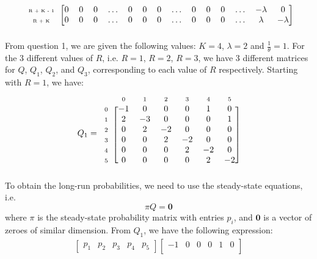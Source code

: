 \documentclass[12pt]{article}
\newcommand{\matindexx}[1]{\mbox{\tiny#1}}%
\newcommand{\matindex}[1]{\mbox{\scriptsize#1}}%
\begin{document}
\begin{equation*}
\begin{blockarray}{ccccccccccccccc}
\begin{block}{c[cccccccccccccc]}
            \matindexx{R + K - 1} & 0 & 0 & 0 & \dots & 0 & 0 & 0 & \dots & 0 & 0 & 0 & \dots & -\lambda & 0 \\
            \matindexx{R + K} & 0 & 0 & 0 & \dots & 0 & 0 & 0 & \dots & 0 & 0 & 0 & \dots & \lambda & -\lambda \\
        \end{block}
    \end{blockarray}
\end{equation*} From question 1, we are given the following values: $K = 4$, $\lambda = 2$ and $\frac{1}{\theta} = 1$. For the 3 different values of $R$, i.e. $R = 1$, $R = 2$, $R = 3$, we have 3 different matrices for $Q$, $Q_1$, $Q_{2}$, and $Q_3$, corresponding to each value of $R$ respectively. Starting with $R = 1$, we have: \begin{equation}
    Q_1 = \begin{blockarray}{ccccccc}
        & \matindex{0} & \matindex{1} & \matindex{2} & \matindex{3} &\matindex{4} &\matindex{5} \\
        \begin{block}{c[cccccc]}
            \matindex{0} & -1 & 0 & 0 & 0 & 1 & 0 \\ 
            \matindex{1} & 2 & -3 & 0 & 0 & 0 & 1 \\ 
            \matindex{2} & 0 & 2 & -2 & 0 & 0 & 0 \\ 
            \matindex{3} & 0 & 0 & 2 & -2 & 0 & 0 \\ 
            \matindex{4} & 0 & 0 & 0 & 2 & -2 & 0 \\ 
            \matindex{5} & 0 & 0 & 0 & 0 & 2 & -2 \\ 
        \end{block}
    \end{blockarray}
\end{equation} To obtain the long-run probabilities, we need to use the steady-state equations, i.e. \begin{equation}
    \pi Q = \mathbf{0}
\end{equation} where $\pi$ is the steady-state probability matrix with entries $p_i$, and $ \mathbf{0}$ is a vector of zeroes of similar dimension. From $Q_{1}$, we have the following expression: \begin{align*}
    \begin{bmatrix}
        p_1 & p_2 & p_3 & p_4 & p_5
    \end{bmatrix} \begin{bmatrix}
        -1 & 0 & 0 & 0 & 1 & 0 \\

\end{bmatrix}
\end{align*}
\end{document}
